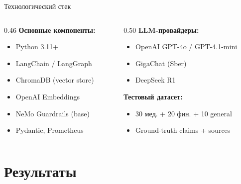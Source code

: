 \documentclass[aspectratio=169, 12pt]{beamer}
\begin{document}
\begin{frame}{Технологический стек}
  \small
  \begin{columns}[T]
    \begin{column}{0.46\textwidth}
      \textbf{Основные компоненты:}
      \begin{itemize}\setlength\itemsep{2pt}
        \item Python 3.11+
        \item LangChain / LangGraph
        \item ChromaDB (vector store)
        \item OpenAI Embeddings
        \item NeMo Guardrails (base)
        \item Pydantic, Prometheus
      \end{itemize}
    \end{column}
    \begin{column}{0.50\textwidth}
      \textbf{LLM-провайдеры:}
      \begin{itemize}\setlength\itemsep{2pt}
        \item OpenAI GPT-4o / GPT-4.1-mini
        \item GigaChat (Sber)
        \item DeepSeek R1
      \end{itemize}
      \vspace{0.2cm}
      \textbf{Тестовый датасет:}
      \begin{itemize}\setlength\itemsep{2pt}
        \item 30 мед. + 20 фин. + 10 general
        \item Ground-truth claims + sources
      \end{itemize}
    \end{column}
  \end{columns}
\end{frame}

\section{Результаты}
\end{document}
